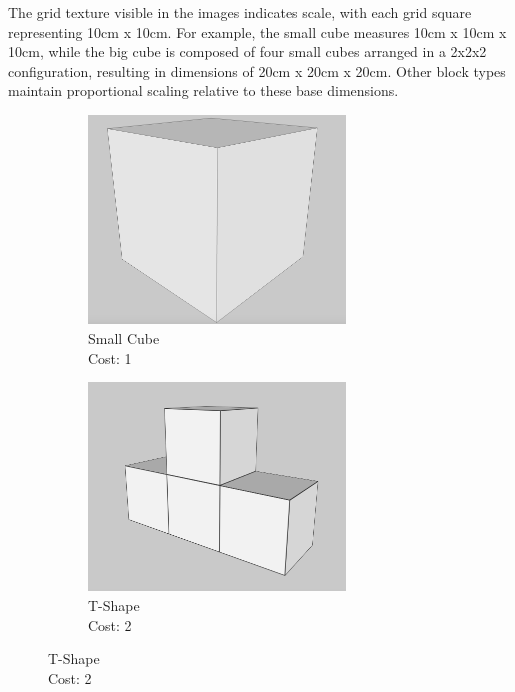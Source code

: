 The grid texture visible in the images indicates scale, with each grid square representing 10cm x 10cm. For example, the small cube measures 10cm x 10cm x 10cm, while the big cube is composed of four small cubes arranged in a 2x2x2 configuration, resulting in dimensions of 20cm x 20cm x 20cm. Other block types maintain proportional scaling relative to these base dimensions.

\begin{figure}[htbp]
    \centering
    \begin{subfigure}[b]{0.28\textwidth}
        \centering
        \includegraphics[width=0.75\textwidth]{user-study-analysis/meta/shapes/cube.png}
        \caption{Small Cube\\Cost: 1}
        \label{fig:small-cube}
    \end{subfigure}
    \hfill
    \begin{subfigure}[b]{0.28\textwidth}
        \centering
        \includegraphics[width=0.75\textwidth]{user-study-analysis/meta/shapes/t-shape.png}
        \caption{T-Shape\\Cost: 2}

\end{subfigure}
\end{figure}

